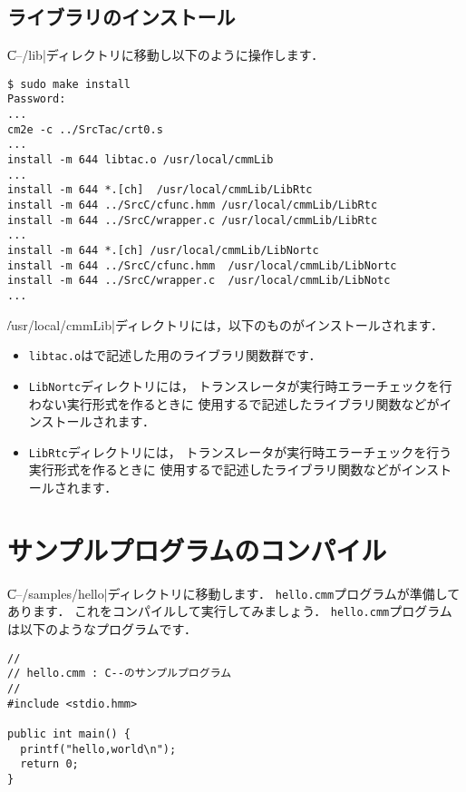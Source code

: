 \subsection{ライブラリのインストール}

\|C--/lib|ディレクトリに移動し以下のように操作します．

\begin{mylist}
\begin{verbatim}
$ sudo make install
Password:
...
cm2e -c ../SrcTac/crt0.s
...
install -m 644 libtac.o /usr/local/cmmLib
...
install -m 644 *.[ch]  /usr/local/cmmLib/LibRtc
install -m 644 ../SrcC/cfunc.hmm /usr/local/cmmLib/LibRtc
install -m 644 ../SrcC/wrapper.c /usr/local/cmmLib/LibRtc
...
install -m 644 *.[ch] /usr/local/cmmLib/LibNortc
install -m 644 ../SrcC/cfunc.hmm  /usr/local/cmmLib/LibNortc
install -m 644 ../SrcC/wrapper.c  /usr/local/cmmLib/LibNotc
...
\end{verbatim}
\end{mylist}

\|/usr/local/cmmLib|ディレクトリには，以下のものがインストールされます．

\begin{itemize}
\item {\tt libtac.o}は{\cmml}で記述した{\tacos}用のライブラリ関数群です．
\item {\tt LibNortc}ディレクトリには，
トランスレータが実行時エラーチェックを行わない実行形式を作るときに
使用する{\cl}で記述したライブラリ関数などがインストールされます．
\item {\tt LibRtc}ディレクトリには，
トランスレータが実行時エラーチェックを行う実行形式を作るときに
使用する{\cl}で記述したライブラリ関数などがインストールされます．
\end{itemize}

\section{サンプルプログラムのコンパイル}

\|C--/samples/hello|ディレクトリに移動します．
{\tt hello.cmm}プログラムが準備してあります．
これをコンパイルして実行してみましょう．
{\tt hello.cmm}プログラムは以下のような{\cmml}プログラムです．

\begin{mylist}
\begin{verbatim}
//
// hello.cmm : C--のサンプルプログラム
//
#include <stdio.hmm>

public int main() {
  printf("hello,world\n");
  return 0;
}
\end{verbatim}
\end{mylist}

